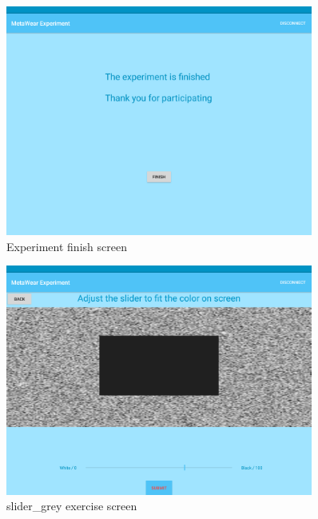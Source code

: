 \begin{figure}[h!]
\centering
\includegraphics[width=0.9\textwidth]{figures/tablet_screen17.png}
\caption{Experiment finish screen}
\label{appendix_app_screen_17}
\end{figure}

\begin{figure}[h!]
\centering
\includegraphics[width=0.9\textwidth]{figures/tablet_screen18.png}
\caption{slider\_grey exercise screen}
\label{appendix_app_screen_18}
\end{figure}